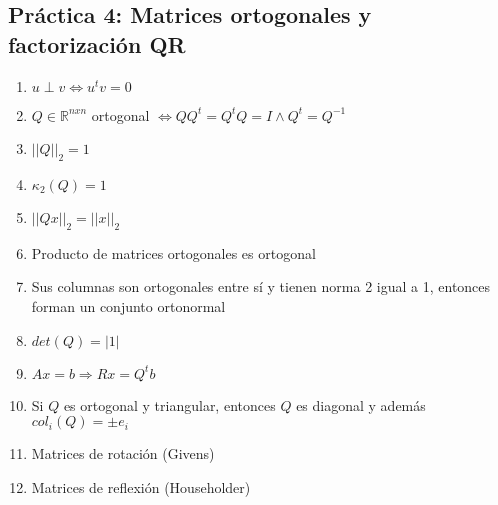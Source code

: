 \subsection*{Práctica 4: Matrices ortogonales y factorización QR}
\begin{enumerate}
    \item $u \perp v \iff u^tv=0$
    \item $Q \in \mathbb{R}^{nxn}$ ortogonal $\iff QQ^t=Q^tQ=I \land Q^t=Q^{-1}$
    \item $||Q||_2 = 1$
    \item $\kappa_2(Q) = 1$
    \item $||Qx||_2=||x||_2$
    \item Producto de matrices ortogonales es ortogonal
    \item Sus columnas son ortogonales entre sí y tienen norma 2 igual a 1, entonces forman un conjunto ortonormal
    \item $det(Q)= |1|$
    \item $Ax=b \Rightarrow Rx=Q^tb$
    \item Si $Q$ es ortogonal y triangular, entonces $Q$ es diagonal y además $col_i(Q)=\pm e_i$
    \item Matrices de rotación (Givens)
    \item Matrices de reflexión (Householder)
\end{enumerate}